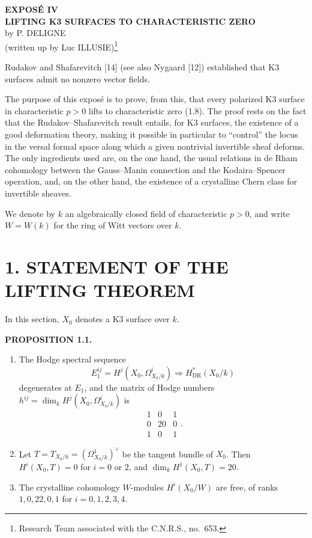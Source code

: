 \documentclass[10pt]{article}
\begin{document}
\setcounter{footnote}{0}
\fontsize{10.2pt}{12.04pt}\selectfont

\begin{center}
\textbf{EXPOSÉ IV}\\[2.5em]
\textbf{LIFTING K3 SURFACES TO CHARACTERISTIC ZERO}\\[2.0em]
by P. DELIGNE\\[0.4em]
(written up by Luc ILLUSIE)\footnote{Research Team associated with the C.N.R.S., no.~653.}
\end{center}

Rudakov and Shafarevitch [14] (see also Nygaard [12]) established that K3 surfaces admit no nonzero vector fields.

The purpose of this exposé is to prove, from this, that every polarized K3 surface in characteristic $p>0$ lifts to characteristic zero (1.8). The proof rests on the fact that the Rudakov--Shafarevitch result entails, for K3 surfaces, the existence of a good deformation theory, making it possible in particular to ``control'' the locus in the versal formal space along which a given nontrivial invertible sheaf deforms. The only ingredients used are, on the one hand, the usual relations in de Rham cohomology between the Gauss--Manin connection and the Kodaira--Spencer operation, and, on the other hand, the existence of a crystalline Chern class for invertible sheaves.

We denote by $k$ an algebraically closed field of characteristic $p>0$, and write $W=W(k)$ for the ring of Witt vectors over $k$.
\newpage
\setcounter{footnote}{0}
\fontsize{10.2pt}{12.04pt}\selectfont

\section*{1. STATEMENT OF THE LIFTING THEOREM}
In this section, $X_0$ denotes a K3 surface over $k$.

\noindent\textbf{PROPOSITION 1.1.}
\begin{enumerate}[label=\alph*)]
\item The Hodge spectral sequence
\[
E_1^{ij}=H^j(X_0,\Omega^i_{X_0/k})\Longrightarrow H^*_{\mathrm{DR}}(X_0/k)
\]
degenerates at $E_1$, and the matrix of Hodge numbers
$h^{ij}=\dim_k H^j(X_0,\Omega^i_{X_0/k})$ is
\[
\begin{matrix}1&0&1\\0&20&0\\1&0&1\end{matrix}.
\]
\item Let $T=T_{X_0/k}=(\Omega^1_{X_0/k})^\vee$ be the tangent bundle of $X_0$. Then $H^i(X_0,T)=0$ for $i=0$ or $2$, and $\dim_kH^1(X_0,T)=20$.
\item The crystalline cohomology $W$-modules $H^i(X_0/W)$ are free, of ranks $1,0,22,0,1$ for $i=0,1,2,3,4$.
\end{enumerate}
\end{document}
